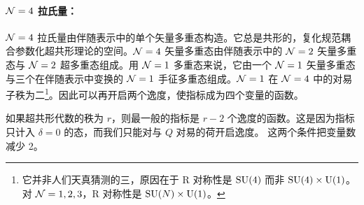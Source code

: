 \paragraph{$\mathcal{N}=4$ 拉氏量：} $\mathcal{N}=4$ 拉氏量由伴随表示中的单个矢量多重态构造。它总是共形的，复化规范耦合参数化超共形理论的空间。$\mathcal{N}=4$ 矢量多重态由伴随表示中的 $\mathcal{N}=2$ 矢量多重态与 $\mathcal{N}=2$ 超多重态组成。用 $\mathcal{N}=1$ 多重态来说，它由一个 $\mathcal{N}=1$ 矢量多重态与三个在伴随表示中变换的 $\mathcal{N}=1$ 手征多重态组成。$\mathcal{N}=1$ 在 $\mathcal{N}=4$ 中的对易子秩为二\footnote{它并非人们天真猜测的三，原因在于 R 对称性是 $\operatorname{SU}(4)$ 而非 $\operatorname{SU}(4)\times\operatorname{U}(1)$。对 $\mathcal{N}=1,2,3$，R 对称性是 $\operatorname{SU}(N)\times\operatorname{U}(1)$。}。因此可以再开启两个逸度，使指标成为四个变量的函数。

如果超共形代数的秩为 $r$，则最一般的指标是 $r-2$ 个逸度的函数。这是因为指标只计入 $\delta=0$ 的态，而我们只能对与 $Q$ 对易的荷开启逸度。
这两个条件把变量数减少 2。

